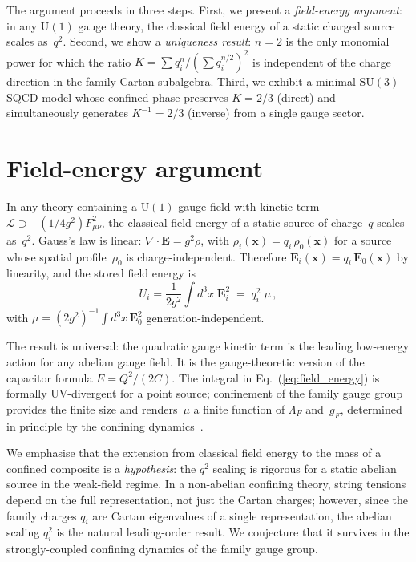 \documentclass[preprint,12pt]{elsarticle}
\newcommand{\SU}{\mathrm{SU}}
\newcommand{\UU}{\mathrm{U}}
\begin{document}
The argument proceeds in three steps.
First, we present a \emph{field-energy argument}:
in any $\UU(1)$ gauge theory, the classical field energy
of a static charged source scales as~$q^2$.
Second, we show a \emph{uniqueness result}:
$n = 2$ is the only monomial power for which the
ratio $K = \sum q_i^n / (\sum q_i^{n/2})^2$ is independent
of the charge direction in the family Cartan subalgebra.
Third, we exhibit a minimal $\SU(3)$ SQCD model
whose confined phase preserves $K = 2/3$ (direct)
and simultaneously generates $K^{-1} = 2/3$ (inverse)
from a single gauge sector.

\section{Field-energy argument}

In any theory containing a $\UU(1)$ gauge field
with kinetic term
$\mathcal{L} \supset -(1/4g^2)F_{\mu\nu}^2$,
the classical field energy of a static source of charge~$q$
scales as~$q^2$.
Gauss's law is linear: $\nabla\!\cdot\!\mathbf{E} = g^2\rho$,
with $\rho_i(\mathbf{x}) = q_i\,\rho_0(\mathbf{x})$
for a source whose spatial profile~$\rho_0$ is
charge-independent.  Therefore
$\mathbf{E}_i(\mathbf{x}) = q_i\,\mathbf{E}_0(\mathbf{x})$
by linearity, and the stored field energy is
\begin{equation}
  U_i = \frac{1}{2g^2}\!\int\!d^3x\;\mathbf{E}_i^2
  \;=\; q_i^2\;\mu\,,
  \label{eq:field_energy}
\end{equation}
with $\mu = (2g^2)^{-1}\!\int\!d^3x\,\mathbf{E}_0^2$
generation-independent.

The result is universal: the quadratic gauge kinetic term
is the leading low-energy action for any abelian gauge field.
It is the gauge-theoretic version of the capacitor formula
$E = Q^2/(2C)$.
The integral in Eq.~(\ref{eq:field_energy}) is formally
UV-divergent for a point source;
confinement of the family gauge group provides the
finite size and renders~$\mu$ a finite function of
$\Lambda_F$ and~$g_F$, determined in principle by
the confining dynamics~\cite{Sumino:2009}.

We emphasise that the extension from classical field
energy to the mass of a confined composite is a
\emph{hypothesis}: the $q^2$ scaling is rigorous for
a static abelian source in the weak-field regime.
In a non-abelian confining theory, string tensions
depend on the full representation, not just
the Cartan charges; however, since the family
charges $q_i$ are Cartan eigenvalues of a single
representation, the abelian scaling
$q_i^2$ is the natural leading-order result.
We conjecture that it survives in the strongly-coupled
confining dynamics of the family gauge group.
\end{document}
